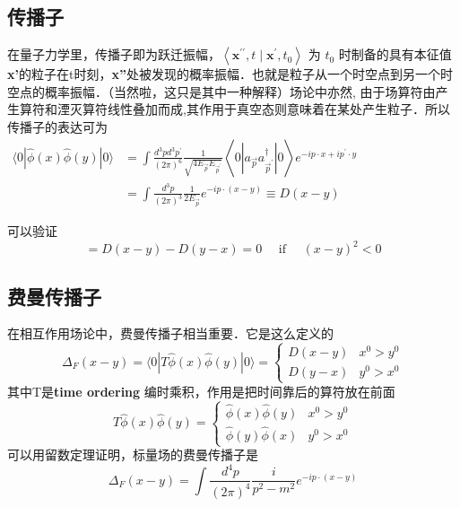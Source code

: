 \subsection{传播子}
在量子力学里，传播子即为跃迁振幅，$\left\langle\mathbf{x}^{\prime \prime}, t \mid \mathbf{x}^{\prime}, t_{0}\right\rangle$ 为 $t_0$ 时制备的具有本征值\textbf{x'}的粒子在t时刻，\textbf{x''}处被发现的概率振幅．也就是粒子从一个时空点到另一个时空点的概率振幅．（当然啦，这只是其中一种解释）场论中亦然,
由于场算符由产生算符和湮灭算符线性叠加而成,其作用于真空态则意味着在某处产生粒子．所以传播子的表达可为
$\begin{aligned}\langle 0|\hat{\phi}(x) \hat{\phi}(y)| 0\rangle &=\int \frac{d^{3} p d^{3} p^{\prime}}{(2 \pi)^{6}} \frac{1}{\sqrt{4 E_{\vec{p}} E_{\vec{p}^{\prime}}}}\left\langle 0\left|a_{\vec{p}} a_{\vec{p}^{\prime}}^{\dagger}\right| 0\right\rangle e^{-i p \cdot x+i p^{\prime} \cdot y} \\ &=\int \frac{d^{3} p}{(2 \pi)^{3}} \frac{1}{2 E_{\vec{p}}} e^{-i p \cdot(x-y)} \equiv D(x-y) \end{aligned}$

可以验证
\begin{equation}
[\hat{\phi}(x), \hat{\phi}(y)]=D(x-y)-D(y-x)=0 \quad \text { if } \quad(x-y)^{2}<0
\end{equation}

\subsection{费曼传播子}
在相互作用场论中，费曼传播子相当重要．它是这么定义的
\begin{equation}
\Delta_{F}(x-y)=\langle 0|T \hat{\phi}(x) \hat{\phi}(y)| 0\rangle=\left\{\begin{array}{ll}
D(x-y) & x^{0}>y^{0} \\
D(y-x) & y^{0}>x^{0}
\end{array}\right.
\end{equation}
其中T是\textbf{time ordering} 编时乘积，作用是把时间靠后的算符放在前面
\begin{equation}
T \hat{\phi}(x) \hat{\phi}(y)=\left\{\begin{array}{ll}
\hat{\phi}(x) \hat{\phi}(y) & x^{0}>y^{0} \\
\hat{\phi}(y) \hat{\phi}(x) & y^{0}>x^{0}
\end{array}\right.
\end{equation}
可以用留数定理证明，标量场的费曼传播子是
\begin{equation}
\Delta_{F}(x-y)=\int \frac{d^{4} p}{(2 \pi)^{4}} \frac{i}{p^{2}-m^{2}} e^{-i p \cdot(x-y)}
\end{equation}

